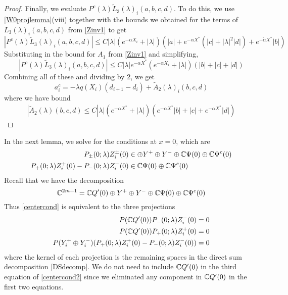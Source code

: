 \documentclass[thesis.tex]{subfiles}
\begin{document}
\begin{lemma}
\begin{proof}
Finally, we evaluate $P^c(\lambda)\tilde{L}_3(\lambda)_i(a,b,c,d)$. To do this, we use \cref{W0projlemma}(viii) together with the bounds we obtained for the terms of $L_3(\lambda)_i(a,b,c,d)$ from \cref{Zinv1} to get 
\begin{equation*}
|P^c(\lambda)\tilde{L}_3(\lambda)_i(a,b,c,d)| \leq C |\lambda|( e^{-\alpha X_i} + |\lambda|) \left( |a| + e^{-\alpha X^*} (|c| + |\lambda|^2 |d|) + e^{-\tilde{\alpha} X^*} |b| \right)
\end{equation*}
Substituting in the bound for $A_1$ from \cref{Zinv1} and simplifying, 
\begin{equation*}
|P^c(\lambda)\tilde{L}_3(\lambda)_i(a,b,c,d)| \leq C |\lambda| e^{-\alpha X^*} ( e^{-\alpha X_i} + |\lambda|) \left( |b| + |c| + |d| \right)
\end{equation*}
Combining all of these and dividing by 2, we get 
\begin{equation*}
a_i^c = -\lambda q(X_i) (d_{i+1} - d_i ) + \tilde{A}_2(\lambda)_i(b, c, d)
\end{equation*}
where we have bound
\begin{align*}
|\tilde{A}_2(\lambda)(b, c, d) \leq C |\lambda| ( e^{-\alpha X^*} + |\lambda|) \left( e^{-\alpha X^*}  |b| + |c| + e^{-\alpha X^*} |d| \right)
\end{align*}
\end{proof}
\end{lemma}

In the next lemma, we solve for the conditions at $x = 0$, which are
\begin{equation}\label{centercond}
\begin{aligned}
P_\pm(0; \lambda) Z_i^\pm(0) &\in \oplus Y^+ \oplus Y^- \oplus \mathbb{C} \Psi(0) \oplus \mathbb{C} \Psi^c(0) \\
P_+(0; \lambda) Z_i^+(0) - P_-(0; \lambda) Z_i^-(0) &\in \mathbb{C} \Psi(0) \oplus \mathbb{C} \Psi^c(0)
\end{aligned}
\end{equation}
Recall that we have the decomposition
\begin{equation}\label{DSdecomp}
\mathbb{C}^{2m+1} = \mathbb{C} Q'(0) \oplus Y^+ \oplus Y^- \oplus \mathbb{C} \Psi(0) \oplus \mathbb{C} \Psi^c(0)
\end{equation}
Thus \eqref{centercond} is equivalent to the three projections
\begin{equation}\label{centercond2}
\begin{aligned}
P(\mathbb{C} Q'(0) ) P_-(0; \lambda) Z_i^-(0) &= 0 \\
P(\mathbb{C} Q'(0) ) P_+(0; \lambda) Z_i^+(0) &= 0 \\
P(Y_i^+ \oplus Y_i^-) ( P_+(0; \lambda) Z_i^+(0) - P_-(0; \lambda) Z_i^-(0) ) &= 0
\end{aligned}
\end{equation}
where the kernel of each projection is the remaining spaces in the direct sum decomposition \eqref{DSdecomp}. We do not need to include $\mathbb{C} Q'(0)$ in the third equation of \eqref{centercond2} since we eliminated any component in $\mathbb{C} Q'(0)$ in the first two equations.
\end{document}

